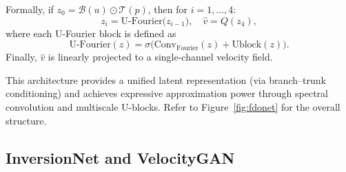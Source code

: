 \documentclass{article}
\begin{document}
Formally, if \(z_0 = \mathcal{B}(u)\odot\mathcal{T}(p)\), then for \(i=1,\dots,4\):
\[
z_i = \text{U-Fourier}\bigl(z_{i-1}\bigr),\quad
\hat{v} = Q(z_4),
\]
where each U-Fourier block is defined as
\[
\text{U-Fourier}(z) = \sigma\bigl(\text{Conv}_\text{Fourier}(z) + \text{Ublock}(z)\bigr).
\]
Finally, \(\hat v\) is linearly projected to a single-channel velocity field.

This architecture provides a unified latent representation (via branch–trunk conditioning) and achieves expressive approximation power through spectral convolution and multiscale U-blocks. Refer to Figure~\ref{fig:fdonet} for the overall structure.


\subsection{InversionNet and VelocityGAN}
\end{document}
